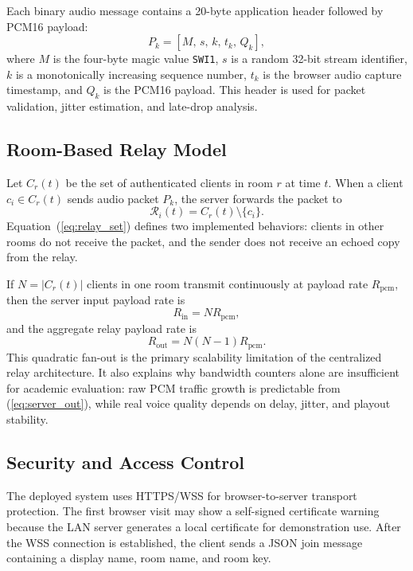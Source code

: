 \documentclass[conference]{IEEEtran}
\begin{document}
Each binary audio message contains a 20-byte application header followed by PCM16 payload:
\begin{equation}
    P_k = [M,\,s,\,k,\,t_k,\,Q_k],
    \label{eq:packet}
\end{equation}
where $M$ is the four-byte magic value \texttt{SWI1}, $s$ is a random 32-bit stream identifier, $k$ is a monotonically increasing sequence number, $t_k$ is the browser audio capture timestamp, and $Q_k$ is the PCM16 payload. This header is used for packet validation, jitter estimation, and late-drop analysis.

\subsection{Room-Based Relay Model}

Let $C_r(t)$ be the set of authenticated clients in room $r$ at time $t$. When a client $c_i\in C_r(t)$ sends audio packet $P_k$, the server forwards the packet to
\begin{equation}
    \mathcal{R}_i(t) = C_r(t)\setminus\{c_i\}.
    \label{eq:relay_set}
\end{equation}
Equation~(\ref{eq:relay_set}) defines two implemented behaviors: clients in other rooms do not receive the packet, and the sender does not receive an echoed copy from the relay.

If $N=|C_r(t)|$ clients in one room transmit continuously at payload rate $R_{\mathrm{pcm}}$, then the server input payload rate is
\begin{equation}
    R_{\mathrm{in}} = NR_{\mathrm{pcm}},
    \label{eq:server_in}
\end{equation}
and the aggregate relay payload rate is
\begin{equation}
    R_{\mathrm{out}} = N(N-1)R_{\mathrm{pcm}}.
    \label{eq:server_out}
\end{equation}
This quadratic fan-out is the primary scalability limitation of the centralized relay architecture. It also explains why bandwidth counters alone are insufficient for academic evaluation: raw PCM traffic growth is predictable from (\ref{eq:server_out}), while real voice quality depends on delay, jitter, and playout stability.

\subsection{Security and Access Control}

The deployed system uses HTTPS/WSS for browser-to-server transport protection. The first browser visit may show a self-signed certificate warning because the LAN server generates a local certificate for demonstration use. After the WSS connection is established, the client sends a JSON join message containing a display name, room name, and room key.
\end{document}
